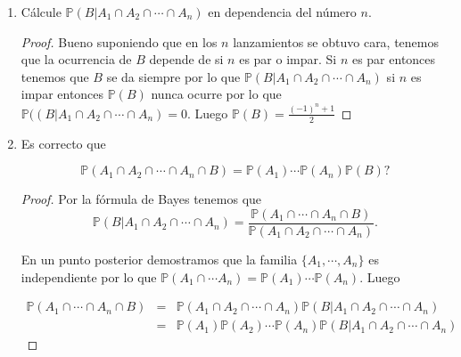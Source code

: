 \documentclass[paper=letter, fontsize=11pt]{scrartcl} %
\numberwithin{equation}{section} %
\numberwithin{figure}{section} %
\numberwithin{table}{section} %
\newcommand{\prob}[1]{\mathbb{P}(#1)}
\begin{document}
\begin{enumerate}[label = \arabic*)]
\begin{proof}
Ahora supongamos que el enunciado se cumple para $ n $ y tomemos las cadenas de tamaño $ n+1 $. Estas cadenas se forman recursivamente agregando un 0 o un 1 al final de las cadenas de tamaño $ n $. Entonces si primero tomamos las cadenas que terminan en 0, vemos que como el 0 no cambia la paridad de la suma de los digitos, este número es igual al número de cadenas con un número par de 1's, es decir, por hipótesis de inducción, $ 2^{n-1}s $. Por otro lado, para las que terminan en 1 este ultimo dígito si cambia la paridad, luego es igual al número de cadenas de tamaño $ n $ con un número impar de 1's. Pero esto es igual a $ 2^n-2^{n-1}=2^{n-1}(2-1)=2^{n-1} $. Por lo tanto el total de cadenas con un número par de 1's es $ 2^{n-1}+2^{n-1}=22^{n-1}=2^n  $.

Por lo tanto concluimos que $ \prob{B}=\frac{1}{2^n}2^{n-1}=\frac{1}{2} $.  
\end{proof}
\item Cálcule $ \mathbb{P}(B|A_1 \cap A_2 \cap \cdots \cap A_n) $ en dependencia del número $ n $.

\begin{proof}
Bueno suponiendo que en los $ n $ lanzamientos se obtuvo cara, tenemos que la ocurrencia de $ B $ depende de si $ n $ es par o impar. Si $ n $ es par entonces tenemos que $ B $ se da siempre por lo que $ \prob{B|A_1 \cap A_2 \cap \cdots \cap A_n} $ si $ n $ es impar entonces $ \prob{B} $ nunca ocurre por lo que $ \prob{(B|A_1 \cap A_2 \cap \cdots \cap A_n}=0 $. Luego $ \prob{B}=\frac{(-1)^n+1}{2}  $
\end{proof}
\item Es correcto que

\begin{equation}
\mathbb{P}(A_1 \cap A_2 \cap \cdots \cap A_n \cap B)= \mathbb{P}(A_1) \cdots \mathbb{P}(A_n)\mathbb{P}(B) \text{?} \nonumber
\end{equation}
\begin{proof}
Por la fórmula de Bayes tenemos que
\begin{equation}
\prob{B|A_1 \cap A_2 \cap \cdots \cap A_n}=\frac{\prob{A_1 \cap \cdots \cap A_n \cap B }}{\prob{A_1 \cap A_2 \cap \cdots \cap A_n}}.  \nonumber
\end{equation}

En un punto posterior demostramos que la familia $ \{A_1,\cdots,A_n\} $ es independiente por lo que $ \prob{A_1 \cap \cdots A_n}= \prob{A_1}\cdots \prob{A_n} $. Luego

\begin{eqnarray}
\prob{A_1 \cap \cdots \cap A_n \cap B }&=& \prob{A_1 \cap A_2 \cap \cdots \cap A_n}\prob{B|A_1 \cap A_2 \cap \cdots \cap A_n} \nonumber
\\&=&\prob{A_1}\prob{A_2}\cdots\prob{A_n}\prob{B|A_1 \cap A_2 \cap \cdots \cap A_n} \nonumber
\end{eqnarray}


\end{proof}
\end{enumerate}
\end{document}
